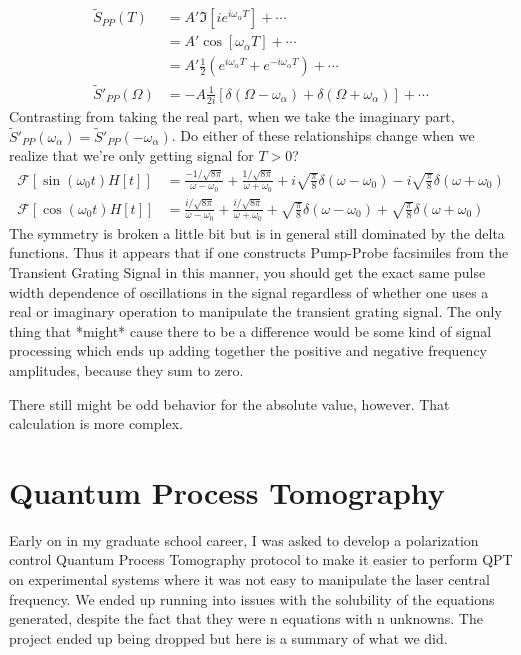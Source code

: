 \begin{align}
	\tilde{S}_{PP}(T) &= A' \Im  \left[ i   e^{i \omega_{\alpha} T}   \right] + \cdots \\
	&= A' \cos  \left[ \omega_{\alpha} T   \right] + \cdots \\
	&= A' \frac{1}{2} \left(  e^{i \omega_{\alpha} T  }  + e^{-i \omega_{\alpha} T  } \right) + \cdots \\
	\tilde{S}'_{PP}(\Omega) &= -A \frac{1}{2i}  \left[  \delta  \left( \Omega - \omega_{\alpha} \right)  + \delta  \left( \Omega + \omega_{\alpha} \right)   \right] + \cdots
\end{align}
Contrasting from taking the real part, when we take the imaginary part,  $\tilde{S}'_{PP}(\omega_{\alpha})  =  \tilde{S}'_{PP}(-\omega_{\alpha})  $.  Do either of these relationships change when we realize that we're only getting signal for $T>0$?
\begin{align*}
	\mathcal{F}\left[\sin \left( \omega_0 t \right) H[t] \right] &= \frac{-1 / \sqrt{8 \pi}}{\omega - \omega_0} + \frac{1 / \sqrt{8 \pi}}{\omega + \omega_0} + i\sqrt{\frac{\pi}{8}} \delta \left( \omega - \omega_0 \right) - i\sqrt{\frac{\pi}{8}} \delta \left( \omega + \omega_0 \right) \\
	\mathcal{F}\left[\cos \left( \omega_0 t \right) H[t] \right] &= \frac{i / \sqrt{8 \pi}}{\omega - \omega_0} + \frac{i / \sqrt{8 \pi}}{\omega + \omega_0} + \sqrt{\frac{\pi}{8}} \delta \left( \omega - \omega_0 \right) + \sqrt{\frac{\pi}{8}} \delta \left( \omega + \omega_0 \right)
\end{align*}
The symmetry is broken a little bit but is in general still dominated by the delta functions.  Thus it appears that if one constructs Pump-Probe facsimiles from the Transient Grating Signal in this manner, you should get the exact same pulse width dependence of oscillations in the signal regardless of whether one uses a real or imaginary operation to manipulate the transient grating signal. The only thing that *might* cause there to be a difference would be some kind of signal processing which ends up adding together the positive and negative frequency amplitudes, because they sum to zero.

There still might be odd behavior for the absolute value, however.  That calculation is more complex.


\section{Quantum Process Tomography}
\newcommand{\real}[1]{\textbf{Re} \left[  #1  \right]}
\newcommand{\imag}[1]{\textbf{Im} \left[  #1  \right]}
Early on in my graduate school career, I was asked to develop a polarization control Quantum Process Tomography protocol to make it easier to perform QPT on experimental systems where it was not easy to manipulate the laser central frequency.  We ended up running into issues with the solubility of the equations generated, despite the fact that they were n equations with n unknowns.  The project ended up being dropped but here is a summary of what we did.

